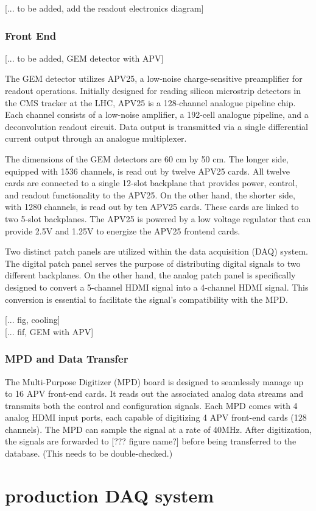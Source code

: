 [... to be added, add the readout electronics diagram]

\subsubsection{Front End}

[... to be added, GEM detector with APV]

The GEM detector utilizes APV25, a low-noise charge-sensitive preamplifier for readout operations\cite{Jones:1069892,Jones:432224}. Initially designed for reading silicon microstrip detectors in the CMS tracker at the LHC, APV25 is a 128-channel analogue pipeline chip. Each channel consists of a low-noise amplifier, a 192-cell analogue pipeline, and a deconvolution readout circuit. Data output is transmitted via a single differential current output through an analogue multiplexer.

The dimensions of the GEM detectors are 60 cm by 50 cm. The longer side, equipped with 1536 channels, is read out by twelve APV25 cards. All twelve cards are connected to a single 12-slot backplane that provides power, control, and readout functionality to the APV25. On the other hand, the shorter side, with 1280 channels, is read out by ten APV25 cards. These cards are linked to two 5-slot backplanes. The APV25 is powered by a low voltage regulator that can provide 2.5V and 1.25V to energize the APV25 frontend cards.

Two distinct patch panels are utilized within the data acquisition (DAQ) system. The digital patch panel serves the purpose of distributing digital signals to two different backplanes. On the other hand, the analog patch panel is specifically designed to convert a 5-channel HDMI signal into a 4-channel HDMI signal. This conversion is essential to facilitate the signal's compatibility with the MPD.


[... fig, cooling] \\

[... fif, GEM with APV]


\subsubsection{MPD and Data Transfer}

The Multi-Purpose Digitizer (MPD) board is designed to seamlessly manage up to 16 APV front-end cards. It reads out the associated analog data streams and transmits both the control and configuration signals. Each MPD comes with 4 analog HDMI input ports, each capable of digitizing 4 APV front-end cards (128 channels). The MPD can sample the signal at a rate of 40MHz. After digitization, the signals are forwarded to [??? figure name?] before being transferred to the database. (This needs to be double-checked.)

\section{production DAQ system}

